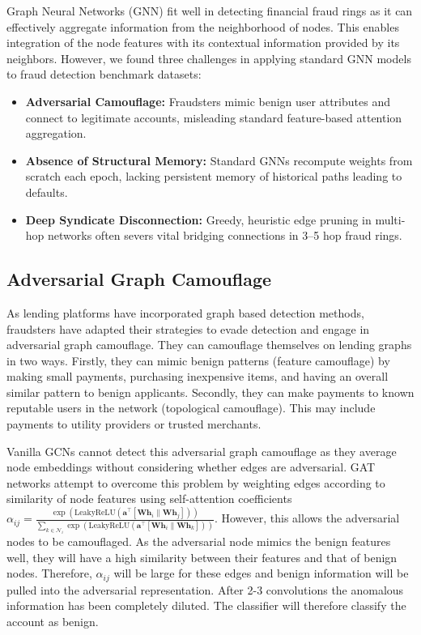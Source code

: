 Graph Neural Networks (GNN) \cite{kipf2017semi, velivckovic2018graph, hamilton2017inductive} fit well in detecting financial fraud rings as it can effectively aggregate information from the neighborhood of nodes. This enables integration of the node features with its contextual information provided by its neighbors. However, we found three challenges in applying standard GNN models to fraud detection benchmark datasets:
\begin{itemize}
    \item \textbf{Adversarial Camouflage:} Fraudsters mimic benign user attributes and connect to legitimate accounts, misleading standard feature-based attention aggregation.
    \item \textbf{Absence of Structural Memory:} Standard GNNs recompute weights from scratch each epoch, lacking persistent memory of historical paths leading to defaults.
    \item \textbf{Deep Syndicate Disconnection:} Greedy, heuristic edge pruning in multi-hop networks often severs vital bridging connections in 3--5 hop fraud rings.
\end{itemize}

\subsection{Adversarial Graph Camouflage}
As lending platforms have incorporated graph based detection methods, fraudsters have adapted their strategies to evade detection and engage in adversarial graph camouflage. They can camouflage themselves on lending graphs in two ways. Firstly, they can mimic benign patterns (feature camouflage) by making small payments, purchasing inexpensive items, and having an overall similar pattern to benign applicants. Secondly, they can make payments to known reputable users in the network (topological camouflage). This may include payments to utility providers or trusted merchants.

Vanilla GCNs cannot detect this adversarial graph camouflage as they average node embeddings without considering whether edges are adversarial. GAT networks attempt to overcome this problem by weighting edges according to similarity of node features using self-attention coefficients $\alpha_{ij} = \frac{\exp(\text{LeakyReLU}(\mathbf{a}^\top [\mathbf{W} \mathbf{h}_i \parallel \mathbf{W} \mathbf{h}_j]))}{\sum_{k \in \mathcal{N}_i} \exp(\text{LeakyReLU}(\mathbf{a}^\top [\mathbf{W} \mathbf{h}_i \parallel \mathbf{W} \mathbf{h}_k]))}$. However, this allows the adversarial nodes to be camouflaged. As the adversarial node mimics the benign features well, they will have a high similarity between their features and that of benign nodes. Therefore, $\alpha_{ij}$ will be large for these edges and benign information will be pulled into the adversarial representation. After 2-3 convolutions the anomalous information has been completely diluted. The classifier will therefore classify the account as benign.

